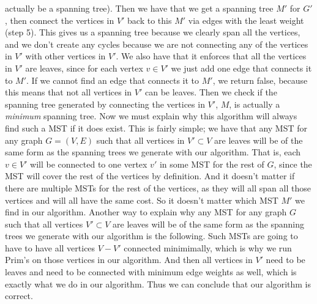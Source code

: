 \documentclass{article}
\begin{document}
actually be a spanning tree). Then we have that we get a spanning tree $M'$
for $G'$, then connect the vertices in $V'$ back to this $M'$ via edges
with the least weight (step 5). This gives us a spanning tree because we clearly
span all the vertices, and we don't create any cycles because we are not
connecting any of the vertices in $V'$ with other vertices in $V'$. We also
have that it enforces that all the vertices in $V'$ are leaves, since
for each vertex $v \in V'$ we just add one edge that connects it to $M'$. If
we cannot find an edge that connects it to $M'$, we return false, because
this means that not all vertices in $V'$ can be leaves.
Then we check if the spanning tree generated by connecting the
vertices in $V'$, $M$, is actually a \textit{minimum} spanning tree. Now we must
explain why this algorithm will always find such a MST if it does exist. This is
fairly simple; we have that any MST for any graph $G = (V, E)$
such that all vertices in $V' \subset V$ are leaves
will be of the same form as the spanning trees we generate with our algorithm.
That is, each $v \in V'$ will be connected to one vertex $v'$ in some MST for
the rest of $G$, since the MST will cover the rest of the vertices by
definition. And it doesn't matter if there are multiple MSTs for the rest of
the vertices, as they will all span all those vertices and will all have the
same cost. So it doesn't matter which MST $M'$ we find in our algorithm.
Another way to explain why any MST for any graph $G$ such that
all vertices $V' \subset V$ are leaves will be of the same form as the spanning
trees we generate with our algorithm is the following. Such MSTs are going to have
to have all vertices $V - V'$ connected minimimally, which is why we run
Prim's on those vertices in our algorithm. And then all vertices in $V'$ need
to be leaves and need to be connected with minimum edge weights as well, which
is exactly what we do in our algorithm. Thus we can conclude that our algorithm
is correct.

\end{document}

